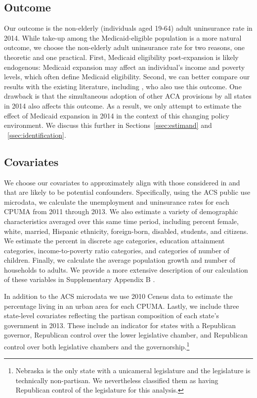 \documentclass[aoas]{imsart}
\theoremstyle{plain}
\theoremstyle{remark}
\begin{document}
\subsection{Outcome}

Our outcome is the non-elderly (individuals aged 19-64) adult uninsurance rate in 2014. While take-up among the Medicaid-eligible population is a more natural outcome, we choose the non-elderly adult uninsurance rate for two reasons, one theoretic and one practical. First, Medicaid eligibility post-expansion is likely endogenous: Medicaid expansion may affect an individual's income and poverty levels, which often define Medicaid eligibility. Second, we can better compare our results with the existing literature, including \citet{courtemanche2017early}, who also use this outcome. One drawback is that the simultaneous adoption of other ACA provisions by all states in 2014 also affects this outcome. As a result, we only attempt to estimate the effect of Medicaid expansion in 2014 in the context of this changing policy environment. We discuss this further in Sections~\ref{ssec:estimand} and ~\ref{ssec:identification}. 

\subsection{Covariates}

We choose our covariates to approximately align with those considered in \citet{courtemanche2017early} and that are likely to be potential confounders. Specifically, using the ACS public use microdata, we calculate the unemployment and uninsurance rates for each CPUMA from 2011 through 2013. We also estimate a variety of demographic characteristics averaged over this same time period, including percent female, white, married, Hispanic ethnicity, foreign-born, disabled, students, and citizens. We estimate the percent in discrete age categories, education attainment categories, income-to-poverty ratio categories, and categories of number of children. Finally, we calculate the average population growth and number of households to adults. We provide a more extensive description of our calculation of these variables in Supplementary Appendix B \citep{supplement}.

In addition to the ACS microdata we use 2010 Census data to estimate the percentage living in an urban area for each CPUMA. Lastly, we include three state-level covariates reflecting the partisan composition of each state's government in 2013. These include an indicator for states with a Republican governor, Republican control over the lower legislative chamber, and Republican control over both legislative chambers and the governorship.\footnote{Nebraska is the only state with a unicameral legislature and the legislature is technically non-partisan. We nevertheless classified them as having Republican control of the legislature for this analysis.} 
\end{document}
